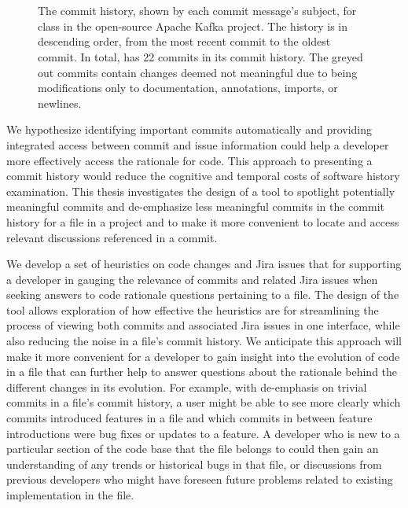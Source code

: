 \begin{figure}
\begin{mdframed}
\begin{RaggedRight}
		\textcolor{gray}{} \\
		 \\
	\end{RaggedRight}
	\end{mdframed}
	\caption{The commit history, shown by each commit message's subject, for  class in the open-source Apache Kafka project. 
		The history is in descending order, from the most recent commit to the oldest commit.
		In total,  has 22 commits in its commit history. The greyed out commits contain changes deemed not meaningful due to being modifications only to documentation, annotations, imports, or newlines.
	}
	\label{fig:Topology-Commit-History}
\end{figure}

We hypothesize identifying important commits automatically and providing integrated access between commit and issue information could help a developer more effectively access the rationale for code.
This approach to presenting a commit history would reduce the cognitive and temporal costs of software history examination. 
This thesis investigates the design of a tool to spotlight potentially meaningful commits and de-emphasize less meaningful commits in the commit history for a file in a project and to make it more convenient to locate and access relevant discussions referenced in a commit. 

We develop a set of heuristics on code changes and Jira issues that for supporting a developer in gauging the relevance of commits and related Jira issues when seeking answers to code rationale questions pertaining to a file.
The design of the tool allows exploration of how effective the heuristics are for streamlining the process of viewing both commits and associated Jira issues in one interface, while also reducing the noise in a file's commit history.
We anticipate this approach will make it more convenient for a developer to gain insight into the evolution of code in a file that can further help to answer questions about the rationale behind the different changes in its evolution. 
For example, with de-emphasis on trivial commits in a file's commit history, a user might be able to see more clearly which commits introduced features in a file and which commits in between feature introductions were bug fixes or updates to a feature.
A developer who is new to a particular section of the code base that the file belongs to could then gain an understanding of any trends or historical bugs in that file, 
or discussions from previous developers who might have foreseen future problems related to existing implementation in the file.

